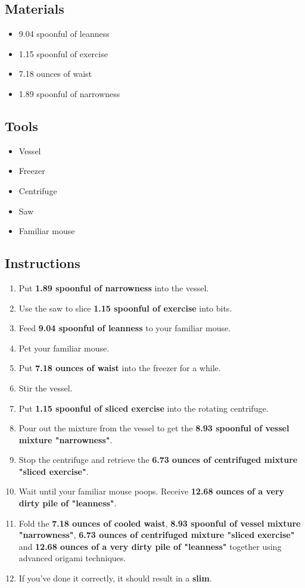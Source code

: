 \documentclass{article}
\begin{document}
\subsection{Materials}\begin{itemize}
\item 
9.04 spoonful of leanness
\item 
1.15 spoonful of exercise
\item 
7.18 ounces of waist
\item 
1.89 spoonful of narrowness
\end{itemize}
\subsection{Tools}\begin{itemize}
\item 
Vessel
\item 
Freezer
\item 
Centrifuge
\item 
Saw
\item 
Familiar mouse
\end{itemize}
\subsection{Instructions}\begin{enumerate}
\item 
Put \textbf{1.89 spoonful of narrowness} into the vessel.
\item 
Use the saw to slice \textbf{1.15 spoonful of exercise} into bits.
\item 
Feed \textbf{9.04 spoonful of leanness} to your familiar mouse.
\item 
Pet your familiar mouse.
\item 
Put \textbf{7.18 ounces of waist} into the freezer for a while.
\item 
Stir the vessel.
\item 
Put \textbf{1.15 spoonful of sliced exercise} into the rotating centrifuge.
\item 
Pour out the mixture from the vessel to get the \textbf{8.93 spoonful of vessel mixture "narrowness"}.
\item 
Stop the centrifuge and retrieve the \textbf{6.73 ounces of centrifuged mixture "sliced exercise"}.
\item 
Wait until your familiar mouse poops. Receive \textbf{12.68 ounces of a very dirty pile of "leanness"}.
\item 
Fold the \textbf{7.18 ounces of cooled waist}, \textbf{8.93 spoonful of vessel mixture "narrowness"}, \textbf{6.73 ounces of centrifuged mixture "sliced exercise"} and \textbf{12.68 ounces of a very dirty pile of "leanness"} together using advanced origami techniques.
\item 
If you've done it correctly, it should result in a \textbf{slim}.
\end{enumerate}
\newpage
\end{document}

